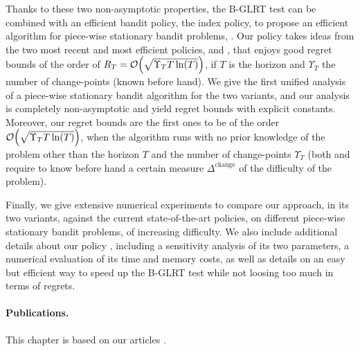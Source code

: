 Thanks to these two non-asymptotic properties, the B-GLRT test can be combined with an efficient bandit policy, the \klUCB{} index policy, to propose an efficient algorithm for piece-wise stationary bandit problems, \GLRklUCB.
Our policy takes ideas from the two most recent and most efficient policies, \CUSUMUCB{} and \MUCB, that enjoys good regret bounds of the order of $R_T = \mathop{}\mathopen{}\mathcal{O}\mathopen{}\left(\sqrt{\Upsilon_T T \ln(T)}\right)$, if $T$ is the horizon and $\Upsilon_T$ the number of change-points (known before hand).
%
We give the first unified analysis of a piece-wise stationary bandit algorithm for the two variants, and our analysis is completely non-asymptotic and yield regret bounds with explicit constants.
Moreover, our regret bounds are the first ones to be of the order $\mathop{}\mathopen{}\mathcal{O}\mathopen{}\left(\sqrt{\Upsilon_T T \ln(T)}\right)$, when the algorithm runs with no prior knowledge of the problem other than the horizon $T$ and the number of change-points $\Upsilon_T$ (both \MUCB{} and \CUSUMUCB{} require to know before hand a certain measure $\Delta^{\text{change}}$ of the difficulty of the problem).

Finally, we give extensive numerical experiments to compare our approach, in its two variants, against the current state-of-the-art policies, on different piece-wise stationary bandit problems, of increasing difficulty.
%
We also include additional details about our policy \GLRklUCB, including a sensitivity analysis of its two parameters, a numerical evaluation of its time and memory costs, as well as details on an easy but efficient way to speed up the B-GLRT test while not loosing too much in terms of regrets.



\paragraph{Publications.}
%
This chapter is based on our articles \cite{Besson2019GLRT,Besson2019Gretsi}.


\graphicspath{{2-Chapters/6-Chapter/Images/}}


